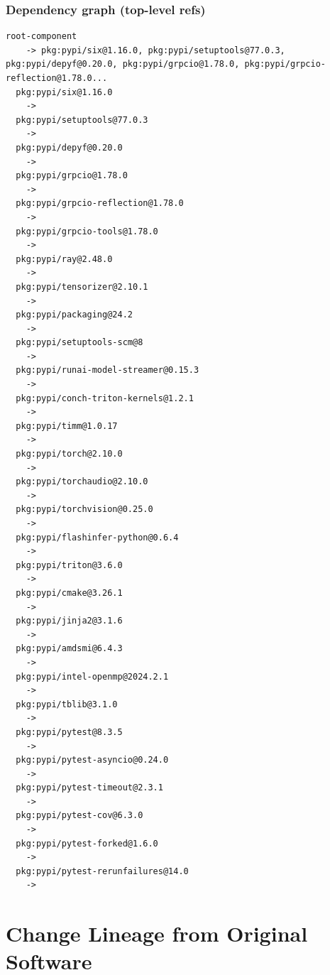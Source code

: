 \documentclass[11pt,a4paper]{article}
\begin{document}
\subsubsection*{Dependency graph (top-level refs)}
\begin{lstlisting}[style=depgraph]
  root-component
    -> pkg:pypi/six@1.16.0, pkg:pypi/setuptools@77.0.3, pkg:pypi/depyf@0.20.0, pkg:pypi/grpcio@1.78.0, pkg:pypi/grpcio-reflection@1.78.0...
  pkg:pypi/six@1.16.0
    -> 
  pkg:pypi/setuptools@77.0.3
    -> 
  pkg:pypi/depyf@0.20.0
    -> 
  pkg:pypi/grpcio@1.78.0
    -> 
  pkg:pypi/grpcio-reflection@1.78.0
    -> 
  pkg:pypi/grpcio-tools@1.78.0
    -> 
  pkg:pypi/ray@2.48.0
    -> 
  pkg:pypi/tensorizer@2.10.1
    -> 
  pkg:pypi/packaging@24.2
    -> 
  pkg:pypi/setuptools-scm@8
    -> 
  pkg:pypi/runai-model-streamer@0.15.3
    -> 
  pkg:pypi/conch-triton-kernels@1.2.1
    -> 
  pkg:pypi/timm@1.0.17
    -> 
  pkg:pypi/torch@2.10.0
    -> 
  pkg:pypi/torchaudio@2.10.0
    -> 
  pkg:pypi/torchvision@0.25.0
    -> 
  pkg:pypi/flashinfer-python@0.6.4
    -> 
  pkg:pypi/triton@3.6.0
    -> 
  pkg:pypi/cmake@3.26.1
    -> 
  pkg:pypi/jinja2@3.1.6
    -> 
  pkg:pypi/amdsmi@6.4.3
    -> 
  pkg:pypi/intel-openmp@2024.2.1
    -> 
  pkg:pypi/tblib@3.1.0
    -> 
  pkg:pypi/pytest@8.3.5
    -> 
  pkg:pypi/pytest-asyncio@0.24.0
    -> 
  pkg:pypi/pytest-timeout@2.3.1
    -> 
  pkg:pypi/pytest-cov@6.3.0
    -> 
  pkg:pypi/pytest-forked@1.6.0
    -> 
  pkg:pypi/pytest-rerunfailures@14.0
    -> 
\end{lstlisting}

\newpage
\section{Change Lineage from Original Software}
\end{document}
